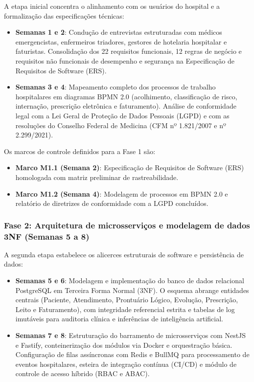 A etapa inicial concentra o alinhamento com os usuários do hospital e a formalização das especificações técnicas:
\begin{itemize}[leftmargin=*]
    \item \textbf{Semanas 1 e 2}: Condução de entrevistas estruturadas com médicos emergencistas, enfermeiros triadores, gestores de hotelaria hospitalar e faturistas. Consolidação dos 22 requisitos funcionais, 12 regras de negócio e requisitos não funcionais de desempenho e segurança na Especificação de Requisitos de Software (ERS).
    \item \textbf{Semanas 3 e 4}: Mapeamento completo dos processos de trabalho hospitalares em diagramas BPMN 2.0 (acolhimento, classificação de risco, internação, prescrição eletrônica e faturamento). Análise de conformidade legal com a Lei Geral de Proteção de Dados Pessoais (LGPD) e com as resoluções do Conselho Federal de Medicina (CFM nº 1.821/2007 e nº 2.299/2021).
\end{itemize}

Os marcos de controle definidos para a Fase 1 são:
\begin{itemize}[leftmargin=*]
    \item \textbf{Marco M1.1 (Semana 2)}: Especificação de Requisitos de Software (ERS) homologada com matriz preliminar de rastreabilidade.
    \item \textbf{Marco M1.2 (Semana 4)}: Modelagem de processos em BPMN 2.0 e relatório de diretrizes de conformidade com a LGPD concluídos.
\end{itemize}

\subsubsection{Fase 2: Arquitetura de microsserviços e modelagem de dados 3NF (Semanas 5 a 8)}

A segunda etapa estabelece os alicerces estruturais de software e persistência de dados:
\begin{itemize}[leftmargin=*]
    \item \textbf{Semanas 5 e 6}: Modelagem e implementação do banco de dados relacional PostgreSQL em Terceira Forma Normal (3NF). O esquema abrange entidades centrais (Paciente, Atendimento, Prontuário Lógico, Evolução, Prescrição, Leito e Faturamento), com integridade referencial estrita e tabelas de log imutáveis para auditoria clínica e inferências de inteligência artificial.
    \item \textbf{Semanas 7 e 8}: Estruturação do barramento de microsserviços com NestJS e Fastify, conteinerização dos módulos via Docker e orquestração básica. Configuração de filas assíncronas com Redis e BullMQ para processamento de eventos hospitalares, esteira de integração contínua (CI/CD) e módulo de controle de acesso híbrido (RBAC e ABAC).
\end{itemize}

